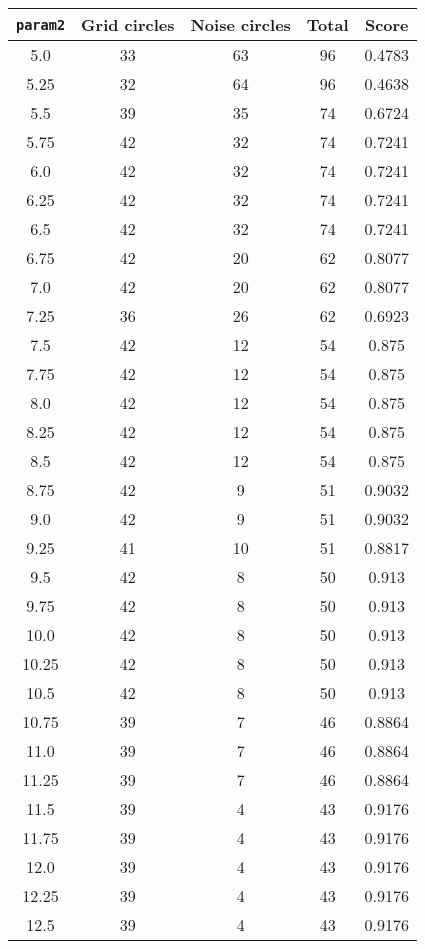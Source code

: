 \documentclass[letterpaper, 12pt]{article}
\begin{document}
\begin{longtable}{|c|c|c|c|c|}
\hline
\textbf{\texttt{param2}} & \textbf{Grid circles} & \textbf{Noise circles} & \textbf{Total} & \textbf{Score} \\
\hline
5.0 & 33 & 63 & 96 & 0.4783 \\
\hline
5.25 & 32 & 64 & 96 & 0.4638 \\
\hline
5.5 & 39 & 35 & 74 & 0.6724 \\
\hline
5.75 & 42 & 32 & 74 & 0.7241 \\
\hline
6.0 & 42 & 32 & 74 & 0.7241 \\
\hline
6.25 & 42 & 32 & 74 & 0.7241 \\
\hline
6.5 & 42 & 32 & 74 & 0.7241 \\
\hline
6.75 & 42 & 20 & 62 & 0.8077 \\
\hline
7.0 & 42 & 20 & 62 & 0.8077 \\
\hline
7.25 & 36 & 26 & 62 & 0.6923 \\
\hline
7.5 & 42 & 12 & 54 & 0.875 \\
\hline
7.75 & 42 & 12 & 54 & 0.875 \\
\hline
8.0 & 42 & 12 & 54 & 0.875 \\
\hline
8.25 & 42 & 12 & 54 & 0.875 \\
\hline
8.5 & 42 & 12 & 54 & 0.875 \\
\hline
8.75 & 42 & 9 & 51 & 0.9032 \\
\hline
9.0 & 42 & 9 & 51 & 0.9032 \\
\hline
9.25 & 41 & 10 & 51 & 0.8817 \\
\hline
9.5 & 42 & 8 & 50 & 0.913 \\
\hline
9.75 & 42 & 8 & 50 & 0.913 \\
\hline
10.0 & 42 & 8 & 50 & 0.913 \\
\hline
10.25 & 42 & 8 & 50 & 0.913 \\
\hline
10.5 & 42 & 8 & 50 & 0.913 \\
\hline
10.75 & 39 & 7 & 46 & 0.8864 \\
\hline
11.0 & 39 & 7 & 46 & 0.8864 \\
\hline
11.25 & 39 & 7 & 46 & 0.8864 \\
\hline
11.5 & 39 & 4 & 43 & 0.9176 \\
\hline
11.75 & 39 & 4 & 43 & 0.9176 \\
\hline
12.0 & 39 & 4 & 43 & 0.9176 \\
\hline
12.25 & 39 & 4 & 43 & 0.9176 \\
\hline
12.5 & 39 & 4 & 43 & 0.9176 \\

\end{longtable}
\end{document}
